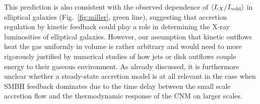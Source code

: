 \documentclass[usenatbib,fleqn]{mn2e}
\begin{document}
This prediction is also consistent with the observed dependence of $\langle
L_{X}/L_{\rm edd} \rangle$ in elliptical galaxies
(Fig.~\ref{fig:miller}, green line), suggesting that accretion regulation
by kinetic feedback could play a role in determining the X-ray
luminosities of elliptical galaxies.  However, our assumption that
kinetic outflows heat the gas uniformly in volume is rather arbitrary and would need to more rigorously justified by numerical studies of how jets or disk outflows couple energy to their gaseous
environment.  As already discussed, it is furthermore unclear whether a steady-state accretion model is at all relevant in the case when SMBH feedback dominates due to the time delay between the small scale accretion flow and the thermodynamic response of the CNM on larger scales.  




\end{document}

